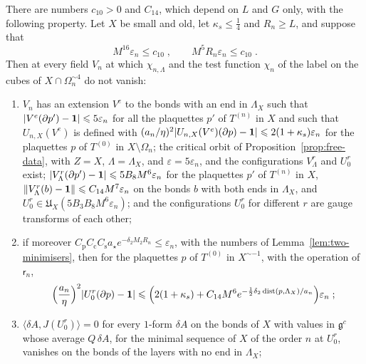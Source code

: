 \documentclass[11pt]{preprint}
\newcommand{\id}{\mathbf 1}
\newcommand{\dist}{\operatorname{dist}}
\DeclarePairedDelimiter{\abs}{\lvert}{\rvert}
\DeclarePairedDelimiter{\norm}{\lVert}{\rVert}
\numberwithin{equation}{section}
\begin{document}
\begin{proposition}\label{prop:box-background}
There are numbers $c_{10} > 0$ and $C_{14}$, which depend on $L$ and $G$ only, with the following property. Let $X$ be small and old, let $\kappa_s \leqslant \frac{1}{4}$ and $R_n \geqslant L$, and suppose that
\begin{equation}\label{eq:box-smallness}
    M^{16}\varepsilon_n \leqslant c_{10}\;,
    \qquad
    M^5R_n\varepsilon_n \leqslant c_{10}\;.
\end{equation}
Then at every field $V_n$ at which $\chi_{n,\Lambda}$ and the test function $\chi_n$ of the label on the cubes of $X \cap \Omega^{\sim4}_n$ do not vanish:
\begin{enumerate}[label=(\roman*)]
\item $V_n$ has an extension $V^e$ to the bonds with an end in $\Lambda_X$ such that $\abs{V^e(\partial p') - \id} \leqslant 5\varepsilon_n$ for all the plaquettes $p'$ of $T^{(n)}$ in $X$ and such that $U_{n,X}(V^e)$ is defined with $(a_n/\eta)^2\abs{U_{n,X}(V^e)(\partial p) - \id} \leqslant 2(1 + \kappa_s)\varepsilon_n$ for the plaquettes $p$ of $T^{(0)}$ in $X \setminus \Omega_n$; the critical orbit of Proposition~\ref{prop:free-data}, with $Z = X$, $\Lambda = \Lambda_X$, and $\varepsilon = 5\varepsilon_n$, and the configurations $V^r_\Lambda$ and $U^r_0$ exist; $\abs{V^r_\Lambda(\partial p') - \id} \leqslant 5B_8M^6\varepsilon_n$ for the plaquettes $p'$ of $T^{(n)}$ in $X$, $\norm{V^r_\Lambda(b) - \id} \leqslant C_{14}M^7\varepsilon_n$ on the bonds $b$ with both ends in $\Lambda_X$, and $U^r_0 \in \mathfrak U_X(5B_3B_8M^6\varepsilon_n)$; and the configurations $U^r_0$ for different $r$ are gauge transforms of each other;
\item if moreover $C_{\mathrm p}C_{\mathrm c}C_{\mathrm s}a_\star e^{-\delta_2M_2R_n} \leqslant \varepsilon_n$, with the numbers of Lemma~\ref{lem:two-minimisers}, then for the plaquettes $p$ of $T^{(0)}$ in $X^{\sim-1}$, with the operation of $\mathsf r_n$,
\begin{equation}\label{eq:box-background-plaquettes}
    \Bigl(\frac{a_n}{\eta}\Bigr)^2\abs{U^r_0(\partial p) - \id} \leqslant \Bigl(2(1 + \kappa_s) + C_{14}M^6e^{-\frac{1}{2}\delta_2\dist(p, \Lambda_X)/a_n}\Bigr)\varepsilon_n\;;
\end{equation}
\item $\langle\delta A, J(U^r_0)\rangle = 0$ for every $1$-form $\delta A$ on the bonds of $X$ with values in $\mathfrak g^c$ whose average $Q\,\delta A$, for the minimal sequence of $X$ of the order $n$ at $U^r_0$, vanishes on the bonds of the layers with no end in $\Lambda_X$;

\end{enumerate}
\end{proposition}
\end{document}

